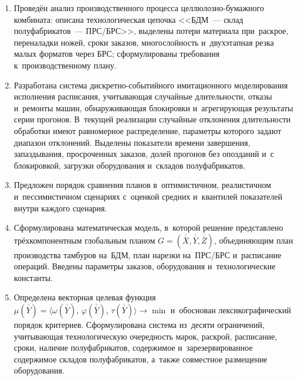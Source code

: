 \begin{enumerate}
  \item Проведён анализ производственного процесса целлюлозно-бумажного комбината: описана технологическая цепочка <<БДМ~--- склад полуфабрикатов~--- ПРС/БРС>>, выделены потери материала при~раскрое, переналадки ножей, сроки заказов, многослойность и~двухэтапная резка малых форматов через БРС; сформулированы требования к~производственному плану.

  \item Разработана система дискретно-событийного имитационного моделирования исполнения расписания, учитывающая случайные длительности, отказы и~ремонты машин, обнаруживающая блокировки и~агрегирующая результаты серии прогонов. В~текущей реализации случайные отклонения длительности обработки имеют равномерное распределение, параметры которого задают диапазон отклонений. Выделены показатели времени завершения, запаздывания, просроченных заказов, долей прогонов без опозданий и~с блокировкой, загрузки оборудования и~складов полуфабрикатов.

  \item Предложен порядок сравнения планов в~оптимистичном, реалистичном и~пессимистичном сценариях с~оценкой средних и~квантилей показателей внутри каждого сценария.

  \item Сформулирована математическая модель, в~которой решение представлено трёхкомпонентным глобальным планом $G=(\overline{\overline{X}},\overline{\overline{Y}},\overline{\overline{Z}})$, объединяющим план производства тамбуров на~БДМ, план нарезки на~ПРС/БРС и~расписание операций. Введены параметры заказов, оборудования и~технологические константы.

  \item Определена векторная целевая функция $\mu(\overline{\overline{Y}})=\langle\omega(\overline{\overline{Y}}),\,\varphi(\overline{\overline{Y}}),\,\tau(\overline{\overline{Y}})\rangle\to\min$ и~обоснован лексикографический порядок критериев. Сформулирована система из~десяти ограничений, учитывающая технологическую очередность марок, раскрой, расписание, сроки, наличие полуфабрикатов, содержимое и~зарезервированное содержимое складов полуфабрикатов, а~также совместное размещение оборудования.


\end{enumerate}
